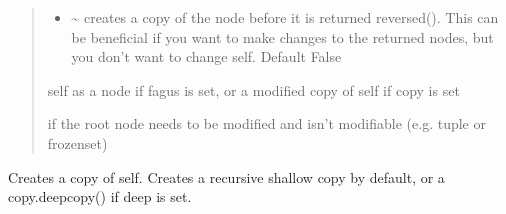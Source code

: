 \documentclass[a4paper,10pt,english]{sphinxmanual}
\begin{document}
\begin{fulllineitems}
\begin{fulllineitems}
\begin{quote}
\begin{description}
\begin{itemize}
\item {}
\sphinxAtStartPar
{} \textendash{} \textasciitilde{} creates a copy of the node before it is returned reversed(). This can be beneficial if you want to
make changes to the returned nodes, but you don’t want to change self. Default False

\end{itemize}

\sphinxAtStartPar
self as a node if fagus is set, or a modified copy of self if copy is set

\sphinxAtStartPar
{} \textendash{} if the root node needs to be modified and isn’t modifiable (e.g. tuple or frozenset)

\end{description}\end{quote}

\end{fulllineitems}


\begin{fulllineitems}
\label{\detokenize{fagus.fagus:fagus.fagus.Fagus.copy}}
\pysigstartsignatures
{}
\pysigstopsignatures
\sphinxAtStartPar
Creates a copy of self. Creates a recursive shallow copy by default, or a copy.deepcopy() if deep is set.

\end{fulllineitems}



\end{fulllineitems}
\end{document}

